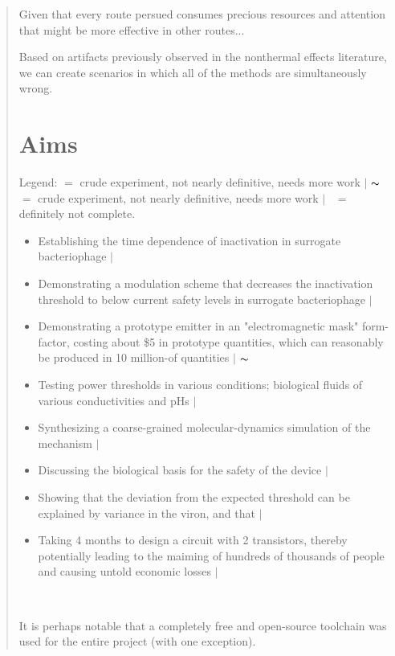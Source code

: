 \documentclass[paper.tex]{subfiles}
\begin{document}
\begin{quotation} %



Given that every route persued consumes precious resources and attention that might be more effective in 
other routes...



Based on artifacts previously observed in the nonthermal effects literature, we can create scenarios in which all of the methods are simultaneously wrong. 

\section{Aims}





Legend:  \cmark $ = $ crude experiment, not nearly definitive, needs more work $\vert$ $\thicksim$ $ = $ crude experiment, not nearly definitive, needs more work $\vert$ \xmark \ $ = $ definitely not complete.\\

\begin{itemize}
  \item Establishing the time dependence of inactivation in surrogate bacteriophage $\vert$ \cmark
  \item Demonstrating a modulation scheme that decreases the inactivation threshold to below current safety levels in surrogate bacteriophage $\vert$ \cmark
  \item Demonstrating a prototype emitter in an "electromagnetic mask" form-factor, costing about \$5 in prototype quantities, which can reasonably be produced in 10 million-of quantities $\vert$ $\thicksim$
  \item Testing power thresholds in various conditions; biological fluids of various conductivities and pHs $\vert$ \xmark
  \item Synthesizing a coarse-grained molecular-dynamics simulation of the mechanism $\vert$ \xmark
  \item Discussing the biological basis for the safety of the device $\vert$ \cmark
  \item Showing that the deviation from the expected threshold can be explained by variance in the viron, and that  $\vert$ \cmark
  \item Taking 4 months to design a circuit with 2 transistors, thereby potentially leading to the maiming of hundreds of thousands of people and causing untold economic losses $\vert$ \cmark
  
\end{itemize}\


\tableofcontents


It is perhaps notable that a completely free and open-source toolchain was used for the entire project (with one exception).

\end{quotation}
\end{document}
